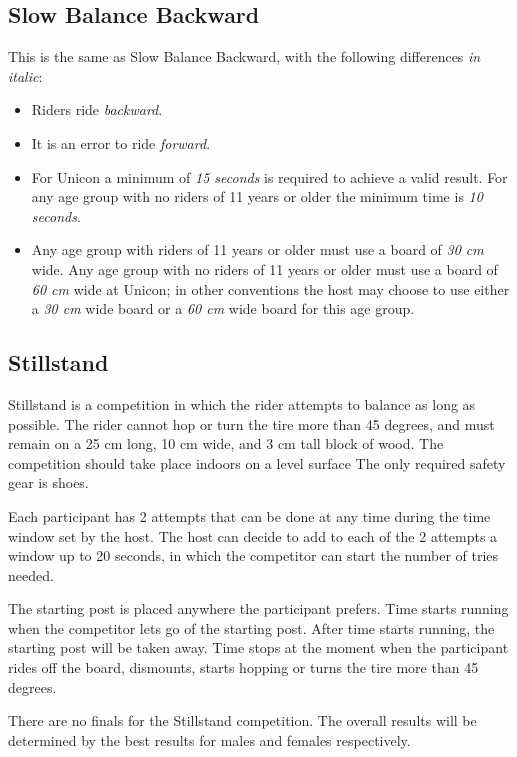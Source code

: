 \subsection{Slow Balance Backward}
This is the same as Slow Balance Backward, with the following differences \textit {in italic}:
\begin{itemize}
\item Riders ride \textit{backward}.
\item It is an error to ride \textit{forward}.
\item For Unicon a minimum of \textit{15 seconds} is required to achieve a valid result.
For any age group with no riders of 11 years or older the minimum time is \textit{10 seconds}.
\item Any age group with riders of 11 years or older must use a board of \textit{30 cm} wide.
Any age group with no riders of 11 years or older must use a board of \textit{60 cm} wide at Unicon; in other conventions the host may choose to use either a \textit{30 cm} wide board or a \textit{60 cm} wide board for this age group.
\end{itemize}

\subsection{Stillstand}
Stillstand is a competition in which the rider attempts to balance as long as possible.
The rider cannot hop or turn the tire more than 45 degrees, and must remain on a 25 cm long, 10 cm wide, and 3 cm tall block of wood.
The competition should take place indoors on a level surface
The only required safety gear is shoes.

Each participant has 2 attempts that can be done at any time during the time window set by the host.
The host can decide to add to each of the 2 attempts a window up to 20 seconds, in which the competitor can start the number of tries needed.

The starting post is placed anywhere the participant prefers.
Time starts running when the competitor lets go of the starting post.
After time starts running, the starting post will be taken away.
Time stops at the moment when the participant rides off the board, dismounts, starts hopping or turns the tire more than 45 degrees.

There are no finals for the Stillstand competition.
The overall results will be determined by the best results for males and females respectively.
